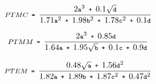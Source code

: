 \documentclass[smallextended,natbib]{svjour3}
\begin{document}
{

\begin{equation}
\footnotesize
\textit{$PTMC$}  \texttt{ = }  \frac{2\texttt{a}^{3}  \texttt{ + }  0.1\sqrt{\texttt{d}}}{1.71\texttt{a}^{2}  \texttt{ + }  1.98\texttt{b}^{2}  \texttt{ + }  1.78\texttt{c}^{2}  \texttt{ + }  0.1\texttt{d}}\\
\label{eq:ptmc}
\end{equation}

\begin{equation}
\footnotesize
\textit{$PTMM$} \texttt{ = } \frac{2\texttt{a}^{3} \texttt{ + } 0.85\texttt{d}}{1.64\texttt{a} \texttt{ + } 1.95\sqrt{\texttt{b}} \texttt{ + } 0.1\texttt{c} \texttt{ + } 0.9\texttt{d}}\\
\label{eq:ptmm}
\end{equation}

\begin{equation}
\footnotesize
\textit{$PTEM$} \texttt{ = } \frac{0.48\sqrt{\texttt{a}} \texttt{ + } 1.56\texttt{d}^{2}}{1.82\texttt{a} \texttt{ + } 1.89\texttt{b} \texttt{ + } 1.87\texttt{c}^{2} \texttt{ + } 0.47\texttt{d}^{2}}
\label{eq:ptem}
\end{equation}
\vspace{-0.2cm}

}
\end{document}
